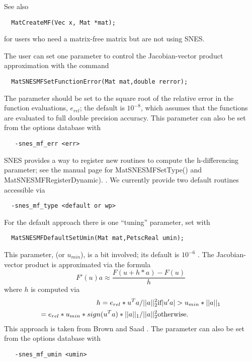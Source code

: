 See also
\begin{verbatim}
  MatCreateMF(Vec x, Mat *mat);
\end{verbatim}
for users who need a matrix-free matrix but are not using SNES.

The user can set one parameter to control the Jacobian-vector
product approximation with the command
\begin{verbatim}
  MatSNESMFSetFunctionError(Mat mat,double rerror);
\end{verbatim}
The parameter  should be set to the square root of the 
relative error in the function evaluations, $e_{rel}$; the default is $ 10^{-8} $, 
which assumes that the functions are evaluated to full double precision accuracy. 
This parameter can also be set from the options database with 
\begin{verbatim}
   -snes_mf_err <err>
\end{verbatim}

SNES provides a way to register new routines to compute the h-differencing parameter;
see the manual page for MatSNESMFSetType() and MatSNESMFRegisterDynamic). 
. We currently provide two default routines accessible via
\begin{verbatim}
  -snes_mf_type <default or wp>
\end{verbatim}
For the default approach there is one ``tuning'' parameter, set with 
\begin{verbatim}
  MatSNESMFDefaultSetUmin(Mat mat,PetscReal umin);
\end{verbatim}
This parameter,  (or $u_{min}$), is a bit involved; its default is 
$ 10^{-6} $ . The Jacobian-vector product is approximated via the formula
\[
    F'(u) a \approx \frac{F(u + h*a) - F(u)}{h}
\]
where $ h $ is computed via 
\begin{eqnarray*}
        h = e_{rel}*u^{T}a/||a||^2_2                       &    \hbox{if}  |u'a| > u_{min}*||a||_{1} \\
          = e_{rel}*u_{min}*sign(u^{T}a)*||a||_{1}/||a||^2_2  &    \hbox{otherwise}.
\end{eqnarray*}
This approach is taken from Brown and Saad \cite{brownsaad:90}.
The parameter can also be set from the options database with 
\begin{verbatim}
   -snes_mf_umin <umin>
\end{verbatim}

